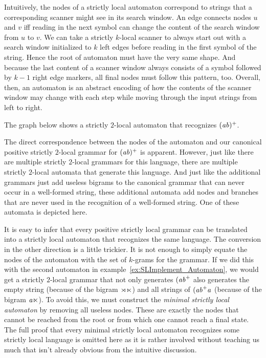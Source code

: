 Intuitively, the nodes of a strictly local automaton correspond to strings that a corresponding scanner might see in its search window.
An edge connects nodes $u$ and $v$ iff reading in the next symbol can change the content of the search window from $u$ to $v$.
We can take a strictly $k$-local scanner to always start out with a search window initialized to $k$ left edges before reading in the first symbol of the string.
Hence the root of automaton must have the very same shape.
And because the last content of a scanner window always consists of a symbol followed by $k-1$ right edge markers, all final nodes must follow this pattern, too.
Overall, then, an automaton is an abstract encoding of how the contents of the scanner window may change with each step while moving through the input strings from left to right.
%
\begin{examplebox}
    The graph below shows a strictly $2$-local automaton that recognizes $(\mathit{ab})^+$.
    \begin{center}
        
    \end{center}
    The direct correspondence between the nodes of the automaton and our canonical positive strictly $2$-local grammar for $(\mathit{ab})^+$ is apparent.
    However, just like there are multiple strictly $2$-local grammars for this language, there are multiple strictly $2$-local automata that generate this language.
    And just like the additional grammars just add useless bigrams to the canonical grammar that can never occur in a well-formed string, these additional automata add nodes and branches that are never used in the recognition of a well-formed string.
    One of these automata is depicted here.
    \begin{center}
        
    \end{center}
\end{examplebox}
%
It is easy to infer that every positive strictly local grammar can be translated into a strictly local automaton that recognizes the same language.
The conversion in the other direction is a little trickier.
It is not enough to simply equate the nodes of the automaton with the set of $k$-grams for the grammar.
If we did this with the second automaton in example~\ref{ex:SLImplement_Automaton}, we would get a strictly $2$-local grammar that not only generates $(\mathit{ab}^+$ also generates the empty string (because of the bigram $\rtimes\ltimes$) and all strings of $(\mathit{ab}^+\mathit{a}$ (because of the bigram $\mathit{a\ltimes}$).
To avoid this, we must construct the \emph{minimal strictly local automaton} by removing all useless nodes.
These are exactly the nodes that cannot be reached from the root or from which one cannot reach a final state.
The full proof that every minimal strictly local automaton recognizes some strictly local language is omitted here as it is rather involved without teaching us much that isn't already obvious from the intuitive discussion.

